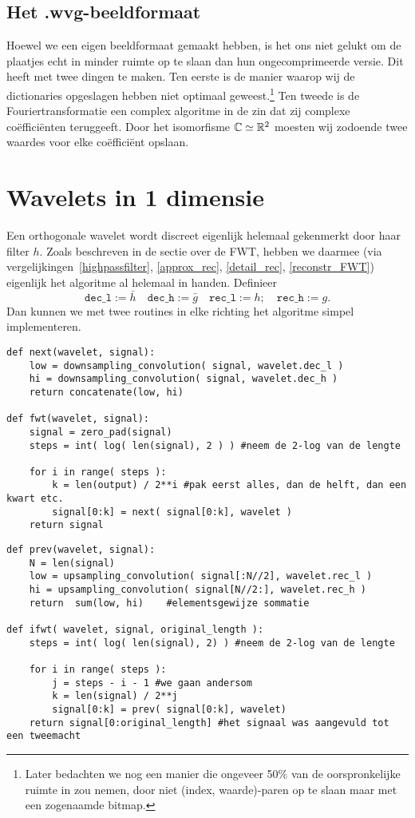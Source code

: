 \subsection{Het .wvg-beeldformaat}
Hoewel we een eigen beeldformaat gemaakt hebben, is het ons niet gelukt om de plaatjes echt in minder ruimte op te slaan dan hun ongecomprimeerde versie. Dit heeft met twee dingen te maken. Ten eerste is de manier waarop wij de dictionaries opgeslagen hebben niet optimaal geweest.\footnote{Later bedachten we nog een manier die ongeveer 50\% van de oorspronkelijke ruimte in zou nemen, door niet (index, waarde)-paren op te slaan maar met een zogenaamde bitmap.} Ten tweede is de Fouriertransformatie een complex algoritme in de zin dat zij complexe co\"effici\"enten teruggeeft. Door het isomorfisme $\mathbb{C} \simeq \mathbb{R}^2$ moesten wij zodoende twee waardes voor elke co\"effici\"ent opslaan.

\section{Wavelets in 1 dimensie}
Een orthogonale wavelet wordt discreet eigenlijk helemaal gekenmerkt door haar filter $h$. Zoals beschreven in de sectie over de FWT, hebben we daarmee (via vergelijkingen~\ref{highpassfilter}, \ref{approx_rec}, \ref{detail_rec}, \ref{reconstr_FWT}) eigenlijk het algoritme al helemaal in handen. Definieer
\[
	\texttt{dec\_l} := \bar{h} \quad \texttt{dec\_h} := \bar{g} \quad 
        \texttt{rec\_l} := h; \quad \texttt{rec\_h} := g.
\]
Dan kunnen we met twee routines in elke richting het algoritme simpel implementeren.
\begin{lstlisting}[caption=De FWT]
def next(wavelet, signal):
	low = downsampling_convolution( signal, wavelet.dec_l )
	hi = downsampling_convolution( signal, wavelet.dec_h )
	return concatenate(low, hi)
	
def fwt(wavelet, signal):
	signal = zero_pad(signal)
	steps = int( log( len(signal), 2 ) ) #neem de 2-log van de lengte
	
	for i in range( steps ):
		k = len(output) / 2**i #pak eerst alles, dan de helft, dan een kwart etc.
		signal[0:k] = next( signal[0:k], wavelet )
	return signal
\end{lstlisting}
\begin{lstlisting}[caption=De iFWT]
def prev(wavelet, signal):
	N = len(signal)
	low = upsampling_convolution( signal[:N//2], wavelet.rec_l )
	hi = upsampling_convolution( signal[N//2:], wavelet.rec_h )
	return  sum(low, hi) 	#elementsgewijze sommatie
	
def ifwt( wavelet, signal, original_length ):
	steps = int( log( len(signal), 2) ) #neem de 2-log van de lengte
	
	for i in range( steps ):
		j = steps - i - 1 #we gaan andersom
		k = len(signal) / 2**j
		signal[0:k] = prev( signal[0:k], wavelet)
	return signal[0:original_length] #het signaal was aangevuld tot een tweemacht

\end{lstlisting}

